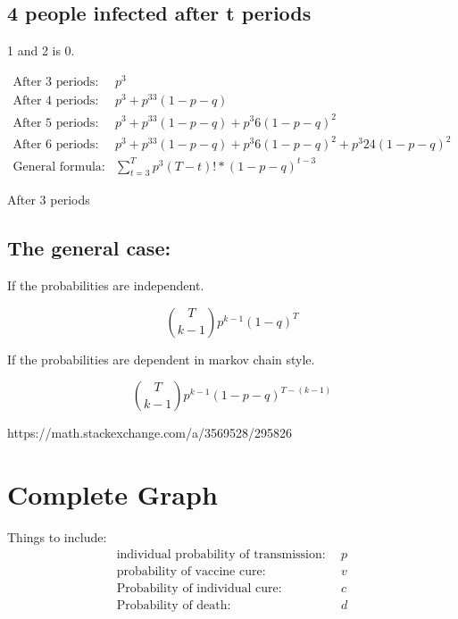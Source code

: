 \documentclass[12pt]{report}
\numberwithin{equation}{section}
\begin{document}
\subsection{4 people infected after t periods}

1 and 2 is 0. 

\begin{align}
\text{After 3 periods}:& p^3 \\
\text{After 4 periods}:& p^3 + p^33(1-p-q) \\
\text{After 5 periods}:& p^3 + p^33(1-p-q) + p^3 6(1-p-q)^2 \\
\text{After 6 periods}:& p^3 + p^33(1-p-q) + p^3 6(1-p-q)^2 + p^3 24(1-p-q)^2 \\
\text{General formula}:& \sum_{t=3}^{T}p^{3}(T-t)!*(1-p-q)^{t-3}
\end{align}

After 3 periods

\subsection{The general case:}

If the probabilities are independent. 

\begin{equation}
\binom{T}{k-1}p^{k-1}(1-q)^T
\end{equation}

If the probabilities are dependent in markov chain style. 

\begin{equation}
\binom{T}{k-1}p^{k-1} (1-p-q)^{T-(k-1)}
\end{equation}

https://math.stackexchange.com/a/3569528/295826



\section{Complete Graph }

Things to include: 
\begin{align}
\text{individual probability of transmission:}& ~~p \\
\text{probability of vaccine cure:}& ~~v \\
\text{Probability of individual cure:}& ~~c \\
\text{Probability of death:}& ~~d
\end{align}
\end{document}
